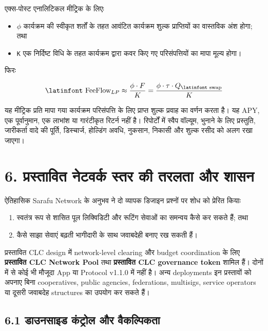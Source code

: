 \documentclass[11pt]{article}
\begin{document}
एक्स-पोस्ट एनालिटिकल मीट्रिक के लिएः

\begin{itemize}[leftmargin=*]
\item \texttt{$\phi$} कार्यक्रम की स्वीकृत शर्तों के तहत आवंटित कार्यक्रम शुल्क प्राप्तियों का वास्तविक अंश होगा; तथा
\item \texttt{K} एक निर्दिष्ट विधि के तहत कार्यक्रम द्वारा कवर किए गए परिसंपत्तियों का मापा मूल्य होगा।
\end{itemize}
फिरः

\[
\text{\latinfont FeeFlow}_{LP} \approx \frac{\phi \cdot F}{K} = \frac{\phi \cdot \tau \cdot Q_{\text{\latinfont swap}}}{K}
\]

यह मीट्रिक प्रति मापा गया कार्यक्रम परिसंपत्ति के लिए प्राप्त शुल्क प्रवाह का वर्णन करता है। यह APY, एक पूर्वानुमान, एक लाभांश या गारंटीकृत रिटर्न नहीं है। रिपोर्टों में स्वैप वॉल्यूम, भुनाने के लिए प्रस्तुति, जारीकर्ता वादे की पूर्ति, डिस्चार्ज, होल्डिंग अवधि, नुकसान, निकासी और शुल्क रसीद को अलग रखा जाएगा।


\section*{6. प्रस्तावित नेटवर्क स्तर की तरलता और शासन}

ऐतिहासिक Sarafu Network के अनुभव ने दो व्यापक डिजाइन प्रश्नों पर शोध को प्रेरित कियाः

\begin{enumerate}[leftmargin=*]
\item स्वतंत्र रूप से शासित पूल लिक्विडिटी और रूटिंग सेवाओं का समन्वय कैसे कर सकते हैं; तथा
\item कैसे साझा सेवाएं बढ़ती भागीदारी के साथ जवाबदेही बनाए रख सकती हैं।
\end{enumerate}
प्रस्तावित CLC design में network-level clearing और budget coordination के लिए \textbf{प्रस्तावित CLC Network Pool} तथा \textbf{प्रस्तावित CLC governance token} शामिल हैं। दोनों में से कोई भी मौजूदा App या Protocol v1.1.0 में नहीं है। अन्य deployments इन प्रस्तावों को अपनाए बिना cooperatives, public agencies, federations, multisigs, service operators या दूसरी जवाबदेह structures का उपयोग कर सकते हैं।

\subsection*{6.1 डाउनसाइड कंट्रोल और वैकल्पिकता}
\end{document}
